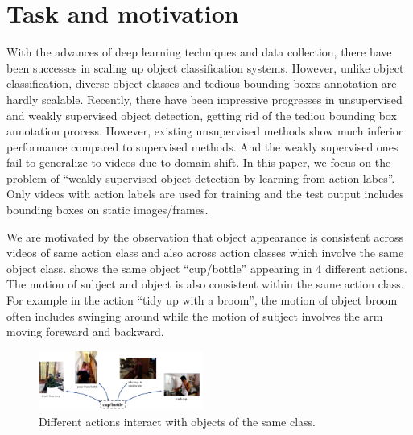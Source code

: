 \vspace{-0.6\baselineskip}
\section{Task and motivation}
\vspace{-0.4\baselineskip}
\label{sec:intro}

With the advances of deep learning techniques and data collection, there have been successes in scaling up object classification systems. However, unlike object classification, diverse object classes and tedious bounding boxes annotation are hardly scalable. Recently, there have been impressive progresses in unsupervised and weakly supervised object detection, getting rid of the tediou bounding box annotation process. However, existing unsupervised methods show much inferior performance compared to supervised methods. And the weakly supervised ones fail to generalize to videos due to domain shift. In this paper, we focus on the problem of ``weakly supervised object detection by learning from action labes''. Only videos with action labels are used for training and the test output includes bounding boxes on static images/frames.

We are motivated by the observation that object appearance is consistent across videos of same action class and also across action classes which involve the same object class.  shows the same object ``cup/bottle'' appearing in 4 different actions. The motion of subject and object is also consistent within the same action class. For example in the action ``tidy up with a broom'', the motion of object broom often includes swinging around while the motion of subject involves the arm moving foreward and backward. 

\begin{figure}
\includegraphics[width=0.48\textwidth]{figures/sameobj_differentaction.pdf}
\caption{Different actions interact with objects of the same class.}
\label{fig:motivation1}
\end{figure}


